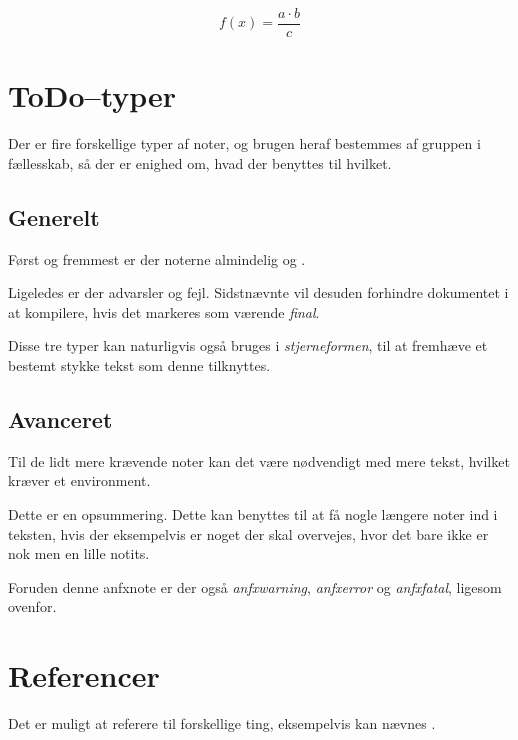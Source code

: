 \begin{equation} \label{eq:example}
  f\left(x\right) = \dfrac{a \cdot b}{c}
\end{equation}

\section{ToDo--typer}
Der er fire forskellige typer af noter, og brugen heraf bestemmes af gruppen i fællesskab, så der er enighed om,
hvad der benyttes til hvilket.

\subsection{Generelt}
Først og fremmest er der noterne almindelig
og .

Ligeledes er der advarsler og fejl. Sidstnævnte
vil desuden forhindre dokumentet i at kompilere, hvis det markeres som værende \emph{final}.

Disse tre typer kan naturligvis også bruges i \emph{stjerneformen}, til at fremhæve et bestemt stykke
tekst som denne tilknyttes.

\subsection{Avanceret}
Til de lidt mere krævende noter kan det være nødvendigt med mere tekst, hvilket kræver et environment.

\begin{anfxnote}{Dette er en opsummering.}
Dette kan benyttes til at få nogle længere noter ind i teksten, hvis der eksempelvis er noget der skal
overvejes, hvor det bare ikke er nok men en lille notits.

Foruden denne anfxnote er der også \emph{anfxwarning}, \emph{anfxerror} og \emph{anfxfatal}, ligesom ovenfor.
\end{anfxnote}


\section{Referencer}
Det er muligt at referere til forskellige ting, eksempelvis kan nævnes .

